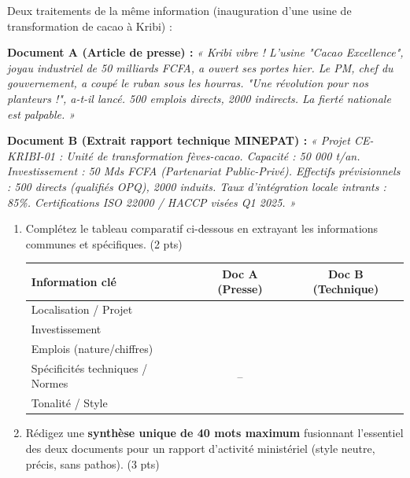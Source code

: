 \documentclass[11pt]{article}
\begin{document}
\begin{exercice}
\label{exo:comparatif}
Deux traitements de la même information (inauguration d'une usine de transformation de cacao à Kribi) :

\textbf{Document A (Article de presse) :} \textit{« Kribi vibre ! L'usine "Cacao Excellence", joyau industriel de 50 milliards FCFA, a ouvert ses portes hier. Le PM, chef du gouvernement, a coupé le ruban sous les hourras. "Une révolution pour nos planteurs !", a-t-il lancé. 500 emplois directs, 2000 indirects. La fierté nationale est palpable. »}

\textbf{Document B (Extrait rapport technique MINEPAT) :} \textit{« Projet CE-KRIBI-01 : Unité de transformation fèves-cacao. Capacité : 50 000 t/an. Investissement : 50 Mds FCFA (Partenariat Public-Privé). Effectifs prévisionnels : 500 directs (qualifiés OPQ), 2000 induits. Taux d'intégration locale intrants : 85\%. Certifications ISO 22000 / HACCP visées Q1 2025. »}

\begin{enumerate}
    \item Complétez le tableau comparatif ci-dessous en extrayant les informations communes et spécifiques. (2 pts)
    \begin{tabularx}{\linewidth}{|X|c|c|}
    \hline
    \textbf{Information clé} & \textbf{Doc A (Presse)} & \textbf{Doc B (Technique)} \\ \hline
    Localisation / Projet & & \\ \hline
    Investissement & & \\ \hline
    Emplois (nature/chiffres) & & \\ \hline
    Spécificités techniques / Normes & -- & \\ \hline
    Tonalité / Style & & \\ \hline
    \end{tabularx}
    \item Rédigez une \textbf{synthèse unique de 40 mots maximum} fusionnant l'essentiel des deux documents pour un rapport d'activité ministériel (style neutre, précis, sans pathos). (3 pts)
\end{enumerate}
\end{exercice}
\end{document}

